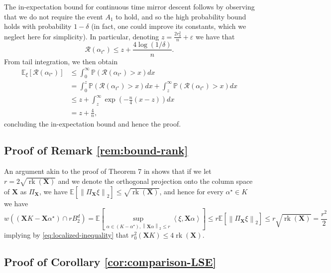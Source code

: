 \documentclass[a4paper]{article}
\newcommand{\pr}[1]{\left(#1\right)}
\newcommand{\br}[1]{\left[#1\right]}
\newcommand{\norm}[1]{\left\|#1\right\|}
\newcommand{\inner}[2]{\left\langle #1,#2\right\rangle}
\newcommand{\X}[0]{\mathbf{X}}
\newcommand{\EE}[0]{\mathbb{E}}
\newcommand{\PP}[0]{\mathbb{P}}
\newcommand{\cR}[0]{\mathcal{R}}
\newcommand{\eps}[0]{\varepsilon}
\newcommand{\alphastar}{\alpha^\star}
\newcommand{\alphatstar}[0]{\alpha_{t^\star}}
\newcommand{\rzero}[0]{r_{0}}
\DeclareMathOperator{\rankOp}{rk}
\newcommand{\rank}[1]{\rankOp\pr{#1}}
\theoremstyle{thmstyle}
\theoremstyle{defstyle}
\theoremstyle{remark}
\begin{document}
The in-expectation bound for continuous time mirror descent follows by observing that we do not require the event $A_1$ to hold, and so the high probability bound holds with probability $1-\delta$ (in fact, one could improve its constants, which we neglect here for simplicity). In particular, denoting $z=\frac{2\rzero^2}{n}+\eps$ we have that
\begin{equation*}
    \cR(\alphatstar)\leq z+\frac{4\log(1/\delta)}{n}.
\end{equation*}
From tail integration, we then obtain
\begin{align*}
    \EE_\xi\br{\cR(\alphatstar)}&\leq \int_0^\infty \PP\pr{\cR(\alphatstar)>x}dx \\
    &=\int_0^{z}\PP\pr{\cR(\alphatstar)>x}dx + \int_{z}^\infty \PP\pr{\cR(\alphatstar)>x}dx \\
    &\leq z + \int_z^\infty \exp\pr{-\frac{n}{4}(x-z)}dx\\
    &= z+\frac{4}{n},
\end{align*}
concluding the in-expectation bound and hence the proof.

\subsection{Proof of Remark \ref{rem:bound-rank}}
\label{subsec:proof-bound-rank}
    An argument akin to the proof of Theorem 7 in \cite{Bellec2017localizedgaussianwidthmconvex} shows that if we let $r=2\sqrt{\rank{\X}}$ and we denote the orthogonal projection onto the column space of $\X$ as $\Pi_\X$, we have $\EE\br{\norm{\Pi_\X\xi}_2}\leq \sqrt{\rank{\X}}$, and hence for every $\alphastar\in K$ we have
    \begin{equation*}
        w((\X K-\X\alphastar) \cap rB_2^d)=\EE\br{\sup_{\alpha\in (K-\alphastar),\norm{\X\alpha}_2\leq r}\inner{\xi}{\X\alpha}}\leq r\EE\br{\norm{\Pi_\X\xi}_2}\leq  r\sqrt{\rank{\X}}=\frac{r^2}{2}
    \end{equation*}
    implying by \eqref{eq:localized-inequality} that $\rzero^2(\X K)\leq 4\rank{\X}$.

\subsection{Proof of Corollary \ref{cor:comparison-LSE}}
\label{subsec:proof-comparison-LSE}
\end{document}

